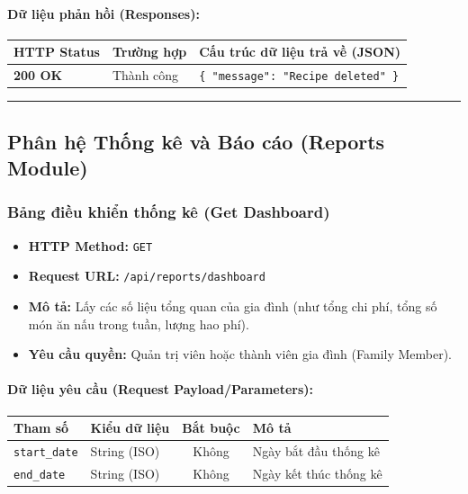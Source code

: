 \documentclass[12pt,a4paper]{article}
\begin{document}
\paragraph{Dữ liệu phản hồi (Responses):}
\begin{longtable}{|p{2.8cm}|p{3.2cm}|p{8.0cm}|}
\hline
\textbf{HTTP Status} & \textbf{Trường hợp} & \textbf{Cấu trúc dữ liệu trả về (JSON)} \\ \hline
\endhead
\textbf{200 OK} & Thành công & \texttt{\{ "message": "Recipe deleted" \}} \\ \hline
\end{longtable}

\vskip 0.4cm
\noindent\rule{\textwidth}{0.3pt}
\vskip 0.4cm

\subsection{Phân hệ Thống kê và Báo cáo (Reports Module)}

\subsubsection{Bảng điều khiển thống kê (Get Dashboard)}
\begin{itemize}[leftmargin=*]
    \item \textbf{HTTP Method:} \texttt{GET}
    \item \textbf{Request URL:} \texttt{/api/reports/dashboard}
    \item \textbf{Mô tả:} Lấy các số liệu tổng quan của gia đình (như tổng chi phí, tổng số món ăn nấu trong tuần, lượng hao phí).
    \item \textbf{Yêu cầu quyền:} Quản trị viên hoặc thành viên gia đình (Family Member).
\end{itemize}

\paragraph{Dữ liệu yêu cầu (Request Payload/Parameters):}
\begin{longtable}{|p{2.8cm}|p{2.2cm}|c|p{7.0cm}|}
\hline
\textbf{Tham số} & \textbf{Kiểu dữ liệu} & \textbf{Bắt buộc} & \textbf{Mô tả} \\ \hline
\endhead
\texttt{start\_date} & String (ISO) & Không & Ngày bắt đầu thống kê \\ \hline
\texttt{end\_date} & String (ISO) & Không & Ngày kết thúc thống kê \\ \hline
\end{longtable}
\end{document}
